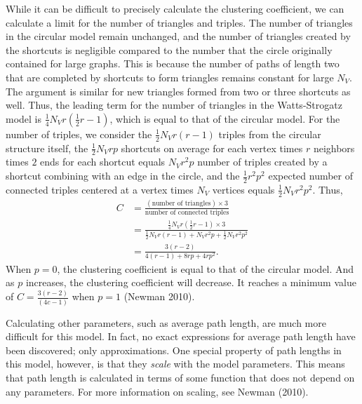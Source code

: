 \documentclass[12pt,twoside]{amherstthesis}
\begin{document}
  While it can be difficult to precisely calculate the clustering
  coefficient, we can calculate a limit for the number of triangles and
  triples. The number of triangles in the circular model remain unchanged,
  and the number of triangles created by the shortcuts is negligible
  compared to the number that the circle originally contained for large
  graphs. This is because the number of paths of length two that are
  completed by shortcuts to form triangles remains constant for large
  \(N_{V}\). The argument is similar for new triangles formed from two or
  three shortcuts as well. Thus, the leading term for the number of
  triangles in the Watts-Strogatz model is
  \(\frac {1} {4} N_{V}r \left(\frac {1} {2} r - 1 \right)\), which is
  equal to that of the circular model. For the number of triples, we
  consider the \(\frac {1} {2} N_{V} r(r - 1)\) triples from the circular
  structure itself, the \(\frac {1} {2}N_{V}rp\) shortcuts on average for
  each vertex times \(r\) neighbors times \(2\) ends for each shortcut
  equals \(N_{V}r^{2}p\) number of triples created by a shortcut combining
  with an edge in the circle, and the \(\frac {1} {2} r^{2} p^2\) expected
  number of connected triples centered at a vertex times \(N_{V}\)
  vertices equals \(\frac {1} {2} N_{V} r^{2} p^2\). Thus, \[
  \begin{aligned}
  C &= \frac {(\text{number of triangles}) \times 3} {\text{number of connected triples}}  \\
  &= \frac {\frac {1} {4} N_{V} r \left(\frac {1} {2} r - 1 \right) \times 3} {\frac {1} {2} N_{V} r(r - 1) + N_{V}r^{2}p + \frac {1} {2} N_{V} r^{2} p^2} \\
  &= \frac{3(r - 2)} {4(r - 1)+8rp + 4rp^{2}}.
  \end{aligned}
  \] When \(p = 0\), the clustering coefficient is equal to that of the
  circular model. And as \(p\) increases, the clustering coefficient will
  decrease. It reaches a minimum value of
  \(C = \frac {3(r - 2)} {(4c - 1)}\) when \(p = 1\) (Newman 2010).
  
  Calculating other parameters, such as average path length, are much more
  difficult for this model. In fact, no exact expressions for average path
  length have been discovered; only approximations. One special property
  of path lengths in this model, however, is that they \emph{scale} with
  the model parameters. This means that path length is calculated in terms
  of some function that does not depend on any parameters. For more
  information on scaling, see Newman (2010).
  
\end{document}
